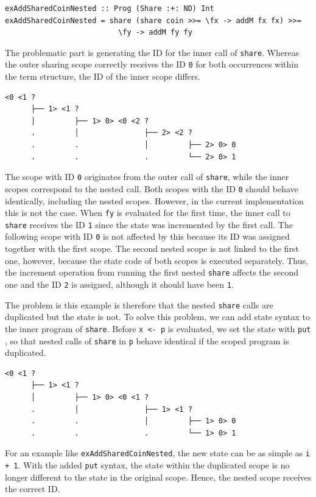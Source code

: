 \documentclass[a4paper, 11pt, fleqn, twoside, abstract=on]{scrreprt}
\newcommand{\hinl}[1]{\texttt{#1}}
\begin{document}
\begin{verbatim}
exAddSharedCoinNested :: Prog (Share :+: ND) Int
exAddSharedCoinNested = share (share coin >>= \fx -> addM fx fx) >>= 
                          \fy -> addM fy fy
\end{verbatim}
\noindent
The problematic part is generating the ID for the inner call of \hinl{share}.
Whereas the outer sharing scope correctly receives the ID \hinl{0} for both occurrences within the term structure, the ID of the inner scope differs.

\begin{verbatim}
<0 <1 ? 
      ├── 1> <1 ? 
      │         ├── 1> 0> <0 <2 ? 
      .         │               ├── 2> <2 ? 
      .         .               │         ├── 2> 0> 0
      .         .               .         └── 2> 0> 1
\end{verbatim}

The scope with ID \hinl{0} originates from the outer call of \hinl{share}, while the inner scopes correspond to the nested call.
Both scopes with the ID \hinl{0} should behave identically, including the nested scopes.
However, in the current implementation this is not the case.
When \hinl{fy} is evaluated for the first time, the inner call to \hinl{share} receives the ID \hinl{1} since the state was incremented by the first call.
The following scope with ID \hinl{0} is not affected by this because its ID was assigned together with the first scope.
The second nested scope is not linked to the first one, however, because the state code of both scopes is executed separately.
Thus, the increment operation from running the first nested \hinl{share} affects the second one and the ID \hinl{2} is assigned, although it should have been \hinl{1}.

The problem is this example is therefore that the nested \hinl{share} calls are duplicated but the state is not.
To solve this problem, we can add state syntax to the inner program of \hinl{share}.
Before \hinl{x <- p} is evaluated, we set the state with \hinl{put} , so that nested calls of \hinl{share} in \hinl{p} behave identical if the scoped program is duplicated.

\begin{verbatim}
<0 <1 ? 
      ├── 1> <1 ? 
      │         ├── 1> 0> <0 <1 ? 
      .         │               ├── 1> <1 ? 
      .         .               │         ├── 1> 0> 0
      .         .               .         └── 1> 0> 1
\end{verbatim}
\noindent
For an example like \hinl{exAddSharedCoinNested}, the new state can be as simple as \hinl{i + 1}.
With the added \hinl{put} syntax, the state within the duplicated scope is no longer different to the state in the original scope.
Hence, the nested scope receives the correct ID.
\end{document}
